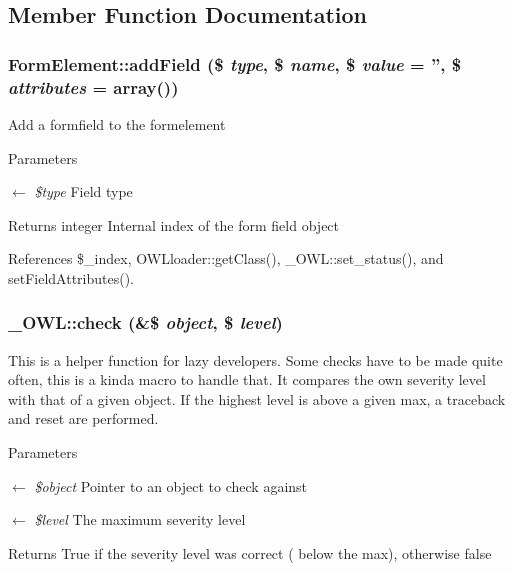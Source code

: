 \subsection{Member Function Documentation}
\subsubsection[{addField}]{\setlength{\rightskip}{0pt plus 5cm}FormElement::addField (\$ {\em type}, \/  \$ {\em name}, \/  \$ {\em value} = {\ttfamily ''}, \/  \$ {\em attributes} = {\ttfamily array()})}\label{classFormElement_a805d7d62c7f794c0414a7a07d3a97112}
Add a formfield to the formelement 
\begin{DoxyParams}{Parameters}
\item[\mbox{$\leftarrow$} {\em \$type}]Field type \end{DoxyParams}
\begin{DoxyReturn}{Returns}
integer Internal index of the form field object 
\end{DoxyReturn}


References \$\_\-index, OWLloader::getClass(), \_\-OWL::set\_\-status(), and setFieldAttributes().

\subsubsection[{check}]{\setlength{\rightskip}{0pt plus 5cm}\_\-OWL::check (\&\$ {\em object}, \/  \$ {\em level})}\label{class__OWL_ad6f4f6946f40199dd0333cf219fa500e}
This is a helper function for lazy developers. Some checks have to be made quite often, this is a kinda macro to handle that. It compares the own severity level with that of a given object. If the highest level is above a given max, a traceback and reset are performed.


\begin{DoxyParams}{Parameters}
\item[\mbox{$\leftarrow$} {\em \$object}]Pointer to an object to check against \item[\mbox{$\leftarrow$} {\em \$level}]The maximum severity level \end{DoxyParams}
\begin{DoxyReturn}{Returns}
True if the severity level was correct ( below the max), otherwise false 
\end{DoxyReturn}


